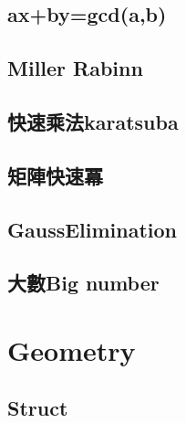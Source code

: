 \subsection{ax+by=gcd(a,b)}


\subsection{Miller Rabinn}


\subsection{快速乘法karatsuba}


\newpage

\subsection{矩陣快速冪}


\subsection{GaussElimination}


\newpage

\subsection{大數Big number}


%

%

\section{Geometry}

\subsection{Struct}


